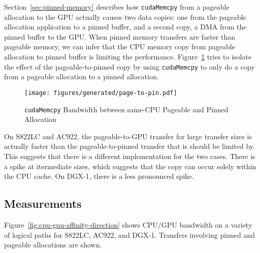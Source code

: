 Section~\ref{sec:pinned-memory} describes how \texttt{cudaMemcpy} from a pageable allocation to the GPU actually causes two data copies: one from the pageable allocation application to a pinned buffer, and a second copy, a DMA from the pinned buffer to the GPU.
When pinned memory transfers are faster than pageable memory, we can infer that the CPU memory copy from pageable allocation to pinned buffer is limiting the performance.
Figure~\ref{fig:explicit-pageable-cpu} tries to isolate the effect of the pageable-to-pinned copy by using \texttt{cudaMemcpy} to only do a copy from a pageable allocation to a pinned allocation.

\begin{figure}[H]
	\centering
	\texttt{[image: figures/generated/page-to-pin.pdf]}
	\caption[Intra-CPU \texttt{cudaMemcpy} Bandwidth]{
        \texttt{cudaMemcpy} Bandwidth between same-CPU Pageable and Pinned Allocation
    }
	\label{fig:explicit-pageable-cpu}
\end{figure}

On S822LC and AC922, the pageable-to-GPU transfer for large transfer sizes is actually faster than the pageable-to-pinned transfer that is should be limited by.
This suggests that there is a different implementation for the two cases.
There is a spike at itermediate sizes, which suggests that the copy can occur solely within the CPU cache.
On DGX-1, there is a less pronounced spike.

\subsection{Measurements}

Figure~\ref{fig:cpu-gpu-affinity-direction} shows CPU/GPU bandwidth on a variety of logical paths for S822LC, AC922, and DGX-1.
Transfers involving pinned and pageable allocations are shown.


